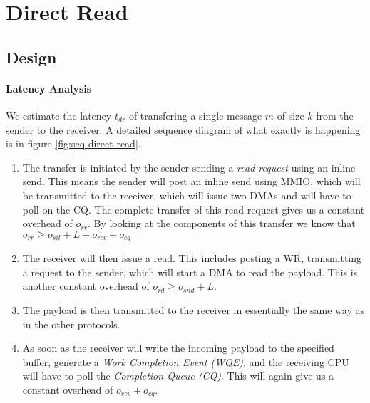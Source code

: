 
\section{Direct Read} \label{sec:conn:direct_read}
\subsection{Design}

\paragraph{Latency Analysis}

We estimate the latency $t_{dr}$ of transfering a single message $m$ of size $k$ from the sender to the receiver. 
A detailed sequence diagram of what exactly is happening is in figure \ref{fig:seq-direct-read}. 

\begin{enumerate}
  \item The transfer is initiated by the sender sending a \emph{read request} using an inline send. This means the sender
    will post an inline send using MMIO, which will be transmitted to the receiver, which will issue two DMAs and will have
    to poll on the CQ. The complete transfer of this read request gives us a constant overhead of $o_{rr}$. By looking at the
    components of this transfer we know that $o_{rr} \geq o_{sil} + L + o_{rcv} + o_{cq}$
  \item The receiver will then issue a read. This includes posting a WR, transmitting a request to the sender, which will start
    a DMA to read the payload. This is another constant overhead of $o_{rd} \geq o_{snd} + L$.
  \item The payload is then transmitted to the receiver in essentially the same way as in the other protocols.
  \item As soon as the receiver will write the incoming payload to the specified buffer, generate a 
    \emph{Work Completion Event (WQE)}, and the receiving CPU will have to poll the \emph{Completion Queue (CQ)}. 
    This will again give us a constant overhead of $o_{rcv} + o_{cq}$. 
\end{enumerate}



